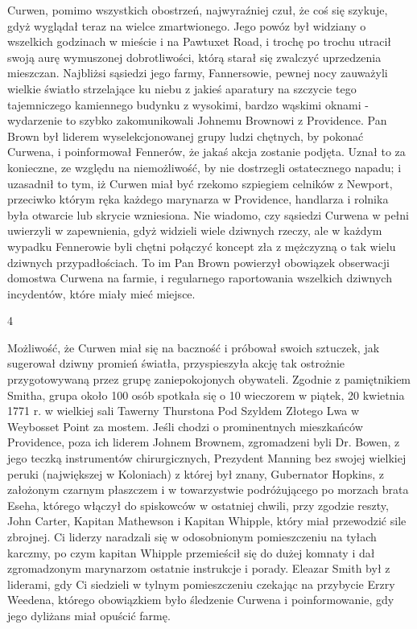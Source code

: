 Curwen, pomimo wszystkich obostrzeń, najwyraźniej czuł, że coś się szykuje, gdyż wyglądał teraz na wielce zmartwionego. Jego powóz był widziany o wszelkich godzinach w mieście i na Pawtuxet Road, i trochę po trochu utracił swoją aurę wymuszonej dobrotliwości, którą starał się zwalczyć uprzedzenia mieszczan. Najbliżsi sąsiedzi jego farmy, Fannersowie, pewnej nocy zauważyli wielkie światło strzelające ku niebu z jakieś aparatury na szczycie tego tajemniczego kamiennego budynku z wysokimi, bardzo wąskimi oknami - wydarzenie to szybko zakomunikowali Johnemu Brownowi z Providence. Pan Brown był liderem wyselekcjonowanej grupy ludzi chętnych, by pokonać Curwena, i poinformował Fennerów, że jakaś akcja zostanie podjęta. Uznał to za konieczne, ze względu na niemożliwość, by nie dostrzegli ostatecznego napadu; i uzasadnił to tym, iż Curwen miał być rzekomo szpiegiem celników z Newport, przeciwko którym ręka każdego marynarza w Providence, handlarza i rolnika była otwarcie lub skrycie wzniesiona. Nie wiadomo, czy sąsiedzi Curwena w pełni uwierzyli w zapewnienia, gdyż widzieli wiele dziwnych rzeczy, ale w każdym wypadku Fennerowie byli chętni połączyć koncept zła z mężczyzną o tak wielu dziwnych przypadłościach. To im Pan Brown powierzył obowiązek obserwacji domostwa Curwena na farmie, i regularnego raportowania wszelkich dziwnych incydentów, które miały mieć miejsce. 

\begin{center}

4

\end{center}

Możliwość, że Curwen miał się na baczność i próbował swoich sztuczek, jak sugerował dziwny promień światła, przyspieszyła akcję tak ostrożnie przygotowywaną przez grupę zaniepokojonych obywateli. Zgodnie z pamiętnikiem Smitha, grupa około 100 osób spotkała się o 10 wieczorem w piątek, 20 kwietnia 1771 r. w wielkiej sali Tawerny Thurstona Pod Szyldem Złotego Lwa w Weybosset Point za mostem. Jeśli chodzi o prominentnych mieszkańców Providence, poza ich liderem Johnem Brownem, zgromadzeni byli Dr. Bowen, z jego teczką instrumentów chirurgicznych, Prezydent Manning bez swojej wielkiej peruki (największej w Koloniach) z której był znany, Gubernator Hopkins, z założonym czarnym płaszczem i w towarzystwie podróżującego po morzach brata Eseha, którego włączył do spiskowców w ostatniej chwili, przy zgodzie reszty, John Carter, Kapitan Mathewson i Kapitan Whipple, który miał przewodzić sile zbrojnej. Ci liderzy naradzali się w odosobnionym pomieszczeniu na tyłach karczmy, po czym kapitan Whipple przemieścił się do dużej komnaty i dał zgromadzonym marynarzom ostatnie instrukcje i porady. Eleazar Smith był z liderami, gdy Ci siedzieli w tylnym pomieszczeniu czekając na przybycie Erzry Weedena, którego obowiązkiem było śledzenie Curwena i poinformowanie, gdy jego dyliżans miał opuścić farmę. 

